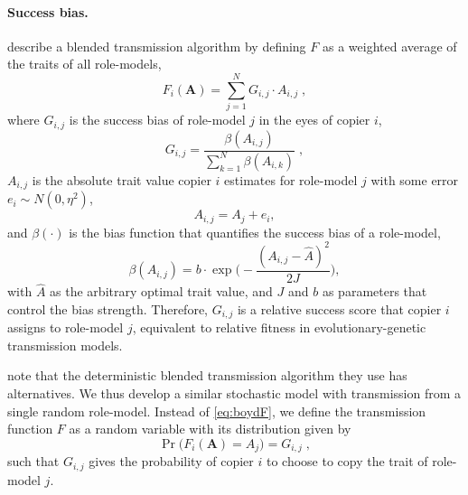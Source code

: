 \documentclass[12pt]{extarticle}
\let\vec\mathbf
\begin{document}
\paragraph{Success bias.}
\citet[Ch.8, p.247-249]{evolutionBook} describe a blended transmission algorithm by defining $F$ as a weighted average of the traits of all role-models, 
\begin{equation}\label{eq:boydF}
F_i(\vec{A}) = \sum_{j=1}^N G_{i,j}\cdot A_{i,j} \;, 
\end{equation}
where $G_{i,j}$ is the success bias of role-model $j$ in the eyes of copier $i$,
\begin{equation}\label{eq:boydG}
G_{i,j} = \frac{\beta(A_{i,j})}{\sum_{k=1}^{N} \beta(A_{i,k})} \;,
\end{equation}
$A_{i,j}$ is the absolute trait value copier $i$ estimates for role-model $j$ with some error $e_i \sim N(0,\eta^2)$,
\begin{equation}\label{eq:relativeTrait}
A_{i,j} = A_j + e_i,
\end{equation}
and $\beta(\cdot)$ is the bias function that quantifies the success bias of a role-model,
\begin{equation}\label{eq:success_bias}
\beta(A_{i,j}) = b \cdot \exp{\Big(-\frac{(A_{i,j} - \hat{A})^2}{2J}\Big)},
\end{equation} 
with $\hat{A}$ as the arbitrary optimal trait value, and $J$ and $b$ as parameters that control the bias strength.
Therefore, $G_{i,j}$ is a relative success score that copier $i$ assigns to role-model $j$, equivalent to relative fitness in evolutionary-genetic transmission models.

\citet{evolutionBook} note that the deterministic blended transmission algorithm they use has alternatives. We thus develop a similar stochastic model with transmission from a single random role-model. Instead of \cref{eq:boydF}, we define the transmission function $F$ as a random variable with its distribution given by 
\begin{equation}\label{eq:ourF}
\Pr\big(F_i(\vec{A}) = A_{j}\big) = G_{i,j} \;,
\end{equation}
such that $G_{i,j}$ gives the probability of copier $i$ to choose to copy the trait of role-model $j$.
\end{document}
